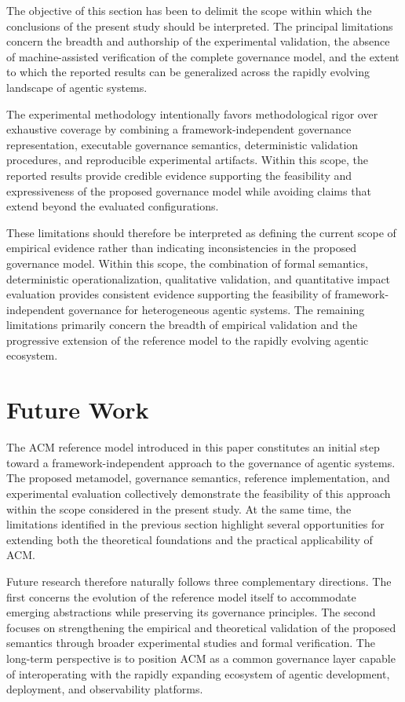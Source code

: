 \documentclass[10pt]{article}
\begin{document}
The objective of this section has been to delimit the scope within which the conclusions of the present study should be interpreted. The principal limitations concern the breadth and authorship of the experimental validation, the absence of machine-assisted verification of the complete governance model, and the extent to which the reported results can be generalized across the rapidly evolving landscape of agentic systems.

The experimental methodology intentionally favors methodological rigor over exhaustive coverage by combining a framework-independent governance representation, executable governance semantics, deterministic validation procedures, and reproducible experimental artifacts. Within this scope, the reported results provide credible evidence supporting the feasibility and expressiveness of the proposed governance model while avoiding claims that extend beyond the evaluated configurations.

These limitations should therefore be interpreted as defining the current scope of empirical evidence rather than indicating inconsistencies in the proposed governance model. Within this scope, the combination of formal semantics, deterministic operationalization, qualitative validation, and quantitative impact evaluation provides consistent evidence supporting the feasibility of framework-independent governance for heterogeneous agentic systems. The remaining limitations primarily concern the breadth of empirical validation and the progressive extension of the reference model to the rapidly evolving agentic ecosystem.

\section{Future Work}
\label{sec:future_work}

The ACM reference model introduced in this paper constitutes an initial step toward a framework-independent approach to the governance of agentic systems. The proposed metamodel, governance semantics, reference implementation, and experimental evaluation collectively demonstrate the feasibility of this approach within the scope considered in the present study. At the same time, the limitations identified in the previous section highlight several opportunities for extending both the theoretical foundations and the practical applicability of ACM.

Future research therefore naturally follows three complementary directions. The first concerns the evolution of the reference model itself to accommodate emerging abstractions while preserving its governance principles. The second focuses on strengthening the empirical and theoretical validation of the proposed semantics through broader experimental studies and formal verification. The long-term perspective is to position ACM as a common governance layer capable of interoperating with the rapidly expanding ecosystem of agentic development, deployment, and observability platforms.
\end{document}
